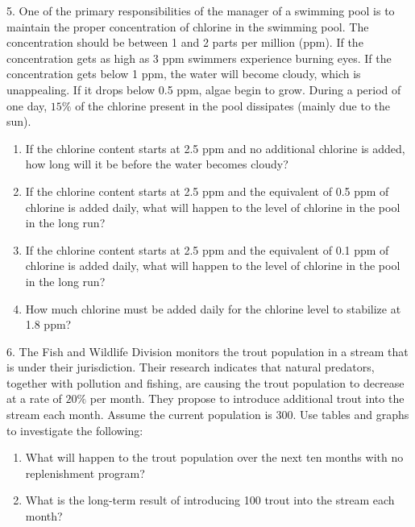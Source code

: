 \documentclass[10pt,]{book}
\theoremstyle{plain}
\theoremstyle{definition}
\theoremstyle{definition}
\theoremstyle{definition}
\numberwithin{equation}{section}
\begin{document}
\begin{exerciselist}
\begin{enumerate}[label=(\alph*)]
\end{enumerate}
%
\par\smallskip
\item[5.]\hypertarget{exercise-7}{}One of the primary responsibilities of the manager of a swimming pool is to maintain the proper concentration of chlorine in the swimming pool.  The concentration should be between 1 and 2 parts per million (ppm).  If the concentration gets as high as 3 ppm swimmers experience burning eyes.  If the concentration gets below 1 ppm, the water will become cloudy, which is unappealing.  If it drops below 0.5 ppm, algae begin to grow.  During a period of one day, \(15\%\) of the chlorine present in the pool dissipates (mainly due to the sun). \leavevmode%
\begin{enumerate}[label=(\alph*)]
\item\hypertarget{li-21}{}If the chlorine content starts at 2.5 ppm and no additional chlorine is added, how long will it be before the water becomes cloudy?%
\item\hypertarget{li-22}{}If the chlorine content starts at 2.5 ppm and the equivalent of 0.5 ppm of chlorine is added daily, what will happen to the level of chlorine in the pool in the long run?%
\item\hypertarget{li-23}{}If the chlorine content starts at 2.5 ppm and the equivalent of 0.1 ppm of chlorine is added daily, what will happen to the level of chlorine in the pool in the long run?%
\item\hypertarget{li-24}{}How much chlorine must be added daily for the chlorine level to stabilize at 1.8 ppm?%
\end{enumerate}
%
\par\smallskip
\item[6.]\hypertarget{exercise-8}{}The Fish and Wildlife Division monitors the trout population in a stream that is under their jurisdiction.  Their research indicates that natural predators, together with pollution and fishing, are causing the trout population to decrease at a rate of \(20\%\) per month.  They propose to introduce additional trout into the stream each month.  Assume the current population is 300.  Use tables and graphs to investigate the following: \leavevmode%
\begin{enumerate}[label=(\alph*)]
\item\hypertarget{li-25}{}What will happen to the trout population over the next ten months with no replenishment program?%
\item\hypertarget{li-26}{}What is the long-term result of introducing 100 trout into the stream each month?%

\end{enumerate}
\end{exerciselist}
\end{document}
